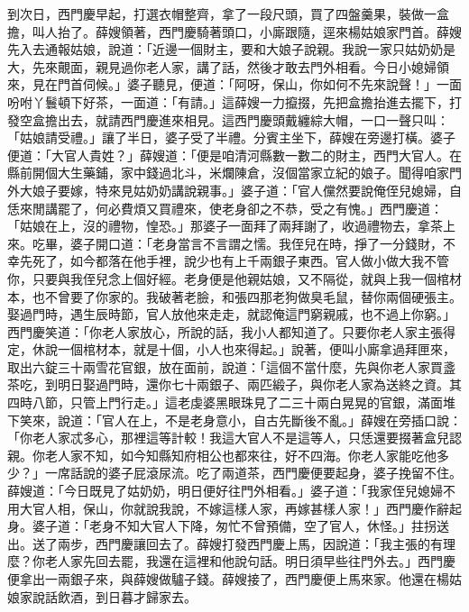 到次日，西門慶早起，打選衣帽整齊，拿了一段尺頭，買了四盤羹果，裝做一盒擔，叫人抬了。薛嫂領著，西門慶騎著頭口，小廝跟隨，逕來楊姑娘家門首。薛嫂先入去通報姑娘，說道：「近邊一個財主，要和大娘子說親。我說一家只姑奶奶是大，先來覿面，親見過你老人家，講了話，然後才敢去門外相看。今日小媳婦領來，見在門首伺候。」婆子聽見，便道：「阿呀，保山，你如何不先來說聲！」一面吩咐丫鬟頓下好茶，一面道：「有請。」這薛嫂一力攛掇，先把盒擔抬進去擺下，打發空盒擔出去，就請西門慶進來相見。這西門慶頭戴纏綜大帽，一口一聲只叫：「姑娘請受禮。」讓了半日，婆子受了半禮。分賓主坐下，薛嫂在旁邊打橫。婆子便道：「大官人貴姓？」薛嫂道：「便是咱清河縣數一數二的財主，西門大官人。在縣前開個大生藥鋪，家中錢過北斗，米爛陳倉，沒個當家立紀的娘子。聞得咱家門外大娘子要嫁，特來見姑奶奶講說親事。」婆子道：「官人儻然要說俺侄兒媳婦，自恁來閒講罷了，何必費煩又買禮來，使老身卻之不恭，受之有愧。」西門慶道： 「姑娘在上，沒的禮物，惶恐。」那婆子一面拜了兩拜謝了，收過禮物去，拿茶上來。吃畢，婆子開口道：「老身當言不言謂之懦。我侄兒在時，掙了一分錢財，不幸先死了，如今都落在他手裡，說少也有上千兩銀子東西。官人做小做大我不管你，只要與我侄兒念上個好經。老身便是他親姑娘，又不隔從，就與上我一個棺材本，也不曾要了你家的。我破著老臉，和張四那老狗做臭毛鼠，替你兩個硬張主。娶過門時，遇生辰時節，官人放他來走走，就認俺這門窮親戚，也不過上你窮。」 西門慶笑道：「你老人家放心，所說的話，我小人都知道了。只要你老人家主張得定，休說一個棺材本，就是十個，小人也來得起。」說著，便叫小廝拿過拜匣來，取出六錠三十兩雪花官銀，放在面前，說道：「這個不當什麼，先與你老人家買盞茶吃，到明日娶過門時，還你七十兩銀子、兩匹緞子，與你老人家為送終之資。其四時八節，只管上門行走。」這老虔婆黑眼珠見了二三十兩白晃晃的官銀，滿面堆下笑來，說道：「官人在上，不是老身意小，自古先斷後不亂。」薛嫂在旁插口說：「你老人家忒多心，那裡這等計較！我這大官人不是這等人，只恁還要掇著盒兒認親。你老人家不知，如今知縣知府相公也都來往，好不四海。你老人家能吃他多少？」一席話說的婆子屁滾尿流。吃了兩道茶，西門慶便要起身，婆子挽留不住。薛嫂道：「今日既見了姑奶奶，明日便好往門外相看。」婆子道：「我家侄兒媳婦不用大官人相，保山，你就說我說，不嫁這樣人家，再嫁甚樣人家！」西門慶作辭起身。婆子道：「老身不知大官人下降，匆忙不曾預備，空了官人，休怪。」拄拐送出。送了兩步，西門慶讓回去了。薛嫂打發西門慶上馬，因說道：「我主張的有理麼？你老人家先回去罷，我還在這裡和他說句話。明日須早些往門外去。」西門慶便拿出一兩銀子來，與薛嫂做驢子錢。薛嫂接了，西門慶便上馬來家。他還在楊姑娘家說話飲酒，到日暮才歸家去。

